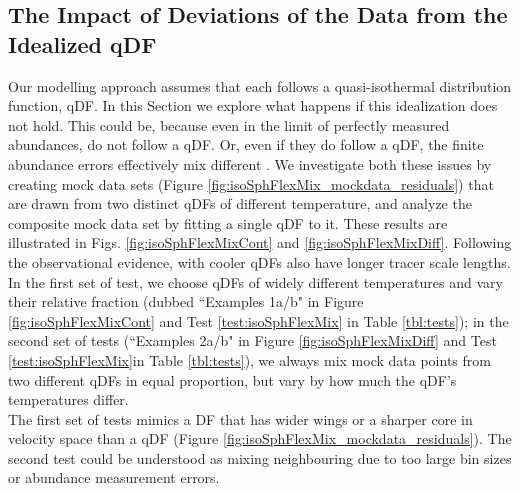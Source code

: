 \subsection{The Impact of Deviations of the Data from the Idealized qDF} \label{sec:results_mixedDFs}

Our modelling approach assumes that each \MAP follows a quasi-isothermal distribution function, qDF. In this Section we explore what happens if this idealization does not hold. This could be, because even in the limit of perfectly measured abundances, \MAPs do not follow a qDF. Or, even if they do follow a qDF, the finite abundance errors effectively mix different \MAPs. We investigate both these issues by creating mock data sets (Figure \ref{fig:isoSphFlexMix_mockdata_residuals}) that are drawn from two distinct qDFs of different temperature, and analyze the composite mock data set by fitting a single qDF to it. These results are illustrated in Figs. \ref{fig:isoSphFlexMixCont} and \ref{fig:isoSphFlexMixDiff}. Following the observational evidence, \MAPs with cooler qDFs also have longer tracer scale lengths. In the first set of test, we choose qDFs of widely different temperatures and vary their relative fraction (dubbed ``Examples 1a/b" in Figure \ref{fig:isoSphFlexMixCont} and Test \ref{test:isoSphFlexMix} in Table \ref{tbl:tests}); in the second set of tests (``Examples 2a/b" in Figure \ref{fig:isoSphFlexMixDiff} and Test \ref{test:isoSphFlexMix}in Table \ref{tbl:tests}), we always mix mock data points from two different qDFs in equal proportion, but vary by how much the qDF's temperatures differ. 
\\The first set of tests mimics a DF that has wider wings or a sharper core in velocity space than a qDF (Figure \ref{fig:isoSphFlexMix_mockdata_residuals}). The second test could be understood as mixing neighbouring \MAPs due to too large bin sizes or abundance measurement errors.

